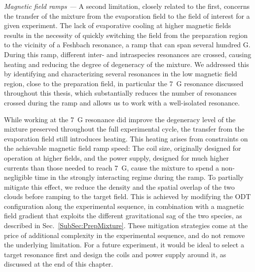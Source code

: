 \textit{Magnetic field ramps ---} A second limitation, closely related to the first, concerns the transfer of the mixture from the evaporation field to the field of interest for a given experiment. The lack of evaporative cooling at higher magnetic fields results in the necessity of quickly switching the field from the preparation region to the vicinity of a Feshbach resonance, a ramp that can span several hundred \unit{G}. During this ramp, different inter- and intraspecies resonances are crossed, causing heating and reducing the degree of degeneracy of the mixture. We addressed this by identifying and characterizing several resonances in the low magnetic field region, close to the preparation field, in particular the \SI{7}{G} resonance discussed throughout this thesis, which substantially reduces the number of resonances crossed during the ramp and allows us to work with a well-isolated resonance.

While working at the \SI{7}{G} resonance did improve the degeneracy level of the mixture preserved throughout the full experimental cycle, the transfer from the evaporation field still introduces heating. This heating arises from constraints on the achievable magnetic field ramp speed: The coil size, originally designed for operation at higher fields, and the power supply, designed for much higher currents than those needed to reach \SI{7}{G}, cause the mixture to spend a non-negligible time in the strongly interacting regime during the ramp. To partially mitigate this effect, we reduce the density and the spatial overlap of the two clouds before ramping to the target field. This is achieved by modifying the \ac{ODT} configuration along the experimental sequence, in combination with a magnetic field gradient that exploits the different gravitational sag of the two species, as described in Sec.~\ref{SubSec:PrepMixture}. These mitigation strategies come at the price of additional complexity in the experimental sequence, and do not remove the underlying limitation. For a future experiment, it would be ideal to select a target resonance first and design the coils and power supply around it, as discussed at the end of this chapter.



